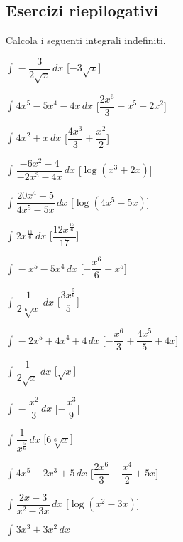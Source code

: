 \subsection{Esercizi riepilogativi}


\begin{esercizio}\label{ese: misti}
Calcola i seguenti integrali indefiniti.
\begin{multicols}{2}
 \begin{enumeratea}
\item \(\int_{}^{}- \dfrac{3}{2 \sqrt{x}}\, dx\) 
 \hfill [\(- 3 \sqrt{x}\)]
\item \(\int_{}^{}4 x^{5} - 5 x^{4} - 4 x\, dx\)
 \hfill [\(\dfrac{2 x^{6}}{3} - x^{5} - 2 x^{2}\)]
\item \(\int_{}^{}4 x^{2} + x\, dx\) 
 \hfill [\(\dfrac{4 x^{3}}{3} + \dfrac{x^{2}}{2}\)]
\item \(\int_{}^{}\dfrac{- 6 x^{2} - 4}{- 2 x^{3} - 4 x}\, dx\) 
 \hfill [\(\log{\left (x^{3} + 2 x \right )}\)]
\item \(\int_{}^{}\dfrac{20 x^{4} - 5}{4 x^{5} - 5 x}\, dx\) 
 \hfill [\(\log{\left (4 x^{5} - 5 x \right )}\)]
\item \(\int_{}^{}2 x^{\frac{11}{6}}\, dx\) 
 \hfill [\(\dfrac{12 x^{\frac{17}{6}}}{17}\)]
\item \(\int_{}^{}- x^{5} - 5 x^{4}\, dx\) 
 \hfill [\(- \dfrac{x^{6}}{6} - x^{5}\)]
\item \(\int_{}^{}\dfrac{1}{2 \sqrt[6]{x}}\, dx\) 
 \hfill [\(\dfrac{3 x^{\frac{5}{6}}}{5}\)]
\item \(\int_{}^{}- 2 x^{5} + 4 x^{4} + 4\, dx\) 
 \hfill [\(- \dfrac{x^{6}}{3} + \dfrac{4 x^{5}}{5} + 4 x\)]
\item \(\int_{}^{}\dfrac{1}{2 \sqrt{x}}\, dx\) 
 \hfill [\(\sqrt{x}\)]
\item \(\int_{}^{}- \dfrac{x^{2}}{3}\, dx\) 
 \hfill [\(- \dfrac{x^{3}}{9}\)]
\item \(\int_{}^{}\dfrac{1}{x^{\frac{5}{6}}}\, dx\) 
 \hfill [\(6 \sqrt[6]{x}\)]
\item \(\int_{}^{}4 x^{5} - 2 x^{3} + 5\, dx\) 
 \hfill [\(\dfrac{2 x^{6}}{3} - \dfrac{x^{4}}{2} + 5 x\)]
\item \(\int_{}^{}\dfrac{2 x - 3}{x^{2} - 3 x}\, dx\) 
 \hfill [\(\log{\left (x^{2} - 3 x \right )}\)]
\item \(\int_{}^{}3 x^{3} + 3 x^{2}\, dx\) 

\end{enumeratea}
\end{multicols}
\end{esercizio}
